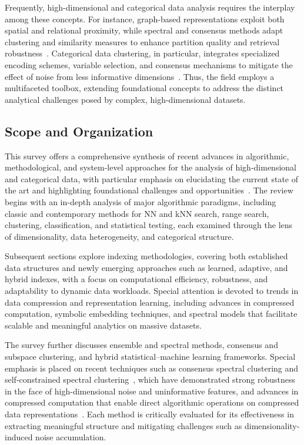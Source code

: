 \documentclass[sigconf]{acmart}
\begin{document}
Frequently, high-dimensional and categorical data analysis requires the interplay among these concepts. For instance, graph-based representations exploit both spatial and relational proximity, while spectral and consensus methods adapt clustering and similarity measures to enhance partition quality and retrieval robustness~\cite{ref43,ref46,ref72,ref73}. Categorical data clustering, in particular, integrates specialized encoding schemes, variable selection, and consensus mechanisms to mitigate the effect of noise from less informative dimensions~\cite{ref39,ref52,ref72,ref73}. Thus, the field employs a multifaceted toolbox, extending foundational concepts to address the distinct analytical challenges posed by complex, high-dimensional datasets.

\subsection{Scope and Organization}

This survey offers a comprehensive synthesis of recent advances in algorithmic, methodological, and system-level approaches for the analysis of high-dimensional and categorical data, with particular emphasis on elucidating the current state of the art and highlighting foundational challenges and opportunities~\cite{ref116,ref117,ref118}. The review begins with an in-depth analysis of major algorithmic paradigms, including classic and contemporary methods for NN and kNN search, range search, clustering, classification, and statistical testing, each examined through the lens of dimensionality, data heterogeneity, and categorical structure.

Subsequent sections explore indexing methodologies, covering both established data structures and newly emerging approaches such as learned, adaptive, and hybrid indexes, with a focus on computational efficiency, robustness, and adaptability to dynamic data workloads. Special attention is devoted to trends in data compression and representation learning, including advances in compressed computation, symbolic embedding techniques, and spectral models that facilitate scalable and meaningful analytics on massive datasets.

The survey further discusses ensemble and spectral methods, consensus and subspace clustering, and hybrid statistical--machine learning frameworks. Special emphasis is placed on recent techniques such as consensus spectral clustering and self-constrained spectral clustering~\cite{ref116,ref117}, which have demonstrated strong robustness in the face of high-dimensional noise and uninformative features, and advances in compressed computation that enable direct algorithmic operations on compressed data representations~\cite{ref118}. Each method is critically evaluated for its effectiveness in extracting meaningful structure and mitigating challenges such as dimensionality-induced noise accumulation.
\end{document}
